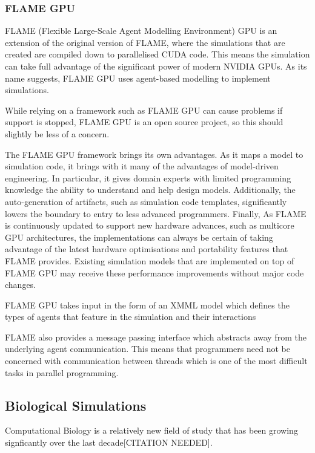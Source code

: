 \documentclass{UoYCSproject}
\begin{document}


\subsubsection{FLAME GPU}
FLAME (Flexible Large-Scale Agent Modelling Environment) GPU is an extension of the original version of FLAME, where the simulations that are created are compiled down to parallelised CUDA code. This means the simulation can take full advantage of the significant power of modern NVIDIA GPUs.
As its name suggests, FLAME GPU uses agent-based modelling to implement simulations.

While relying on a framework such as FLAME GPU can cause problems if support is stopped, FLAME GPU is an open source project, so this should slightly be less of a concern.

The FLAME GPU framework brings its own advantages.
As it maps a model to simulation code, it brings with it many of the advantages of model-driven engineering.
In particular, it gives domain experts with limited programming knowledge the ability to understand and help design models.
Additionally, the auto-generation of artifacts, such as simulation code templates, significantly lowers the boundary to entry to less advanced programmers.
Finally, As FLAME is continuously updated to support new hardware advances, such as multicore GPU architectures\cite{flame_simulation}, the implementations can always be certain of taking advantage of the latest hardware optimisations and portability features that FLAME provides. Existing simulation models that are implemented on top of FLAME GPU may receive these performance improvements without major code changes.

FLAME GPU takes input in the form of an XMML model which defines the types of agents that feature in the simulation and their interactions%

FLAME also provides a message passing interface which abstracts away from the underlying agent communication.
This means that programmers need not be concerned with communication between threads which is one of the most difficult tasks in parallel programming.

\subsection{Biological Simulations}
Computational Biology is a relatively new field of study that has been growing signficantly over the last decade[CITATION NEEDED].
\end{document}
